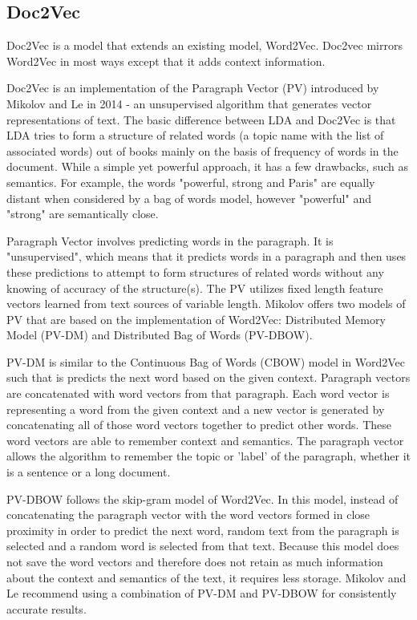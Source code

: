 \subsection{Doc2Vec}
\label{sec:doc2vec}
Doc2Vec is a model that extends an existing model, Word2Vec. Doc2vec mirrors Word2Vec in most ways except that it adds context information. \cite{RefWorks:doc:5a6e5748e4b0d609eec798dd}

Doc2Vec is an implementation of the Paragraph Vector (PV) introduced by Mikolov and Le in 2014 - an unsupervised algorithm that generates vector representations of text. \cite{RefWorks:doc:5a6e5746e4b0d609eec798d7}  The basic difference between LDA and Doc2Vec is that LDA tries to form a structure of related words (a topic name with the list of associated words) out of books mainly on the basis of frequency of words in the document. While a simple yet powerful approach, it has a few drawbacks, such as semantics. For example, the words "powerful, strong and Paris" are equally distant when considered by a bag of words model, however "powerful" and "strong" are semantically close. \cite{RefWorks:doc:5a6e5746e4b0d609eec798d7}
	
Paragraph Vector involves predicting words in the paragraph. It is "unsupervised", which means that it predicts words in a paragraph and then uses these predictions to attempt to form structures of related words without any knowing of accuracy of the structure(s). The PV utilizes fixed length feature vectors learned from text sources of variable length. Mikolov offers two models of PV that are based on the implementation of Word2Vec: Distributed Memory Model (PV-DM) and Distributed Bag of Words (PV-DBOW). 

PV-DM is similar to the Continuous Bag of Words (CBOW) model in Word2Vec such that is predicts the next word based on the given context. Paragraph vectors are concatenated with word vectors from that paragraph.  Each word vector is representing a word from the given context and a new vector is generated by concatenating all of those word vectors together to predict other words. These word vectors are able to remember context and semantics. The paragraph vector allows the algorithm to remember the topic or 'label' of the paragraph, whether it is a sentence or a long document. 

PV-DBOW follows the skip-gram model of Word2Vec. In this model, instead of concatenating the paragraph vector with the word vectors formed in close proximity in order to predict the next word, random text from the paragraph is selected and a random word is selected from that text. Because this model does not save the word vectors and therefore does not retain as much information about the context and semantics of the text, it requires less storage. Mikolov and Le recommend using a combination of PV-DM and PV-DBOW for consistently accurate results.  \cite{RefWorks:doc:5a6e5746e4b0d609eec798d7}

